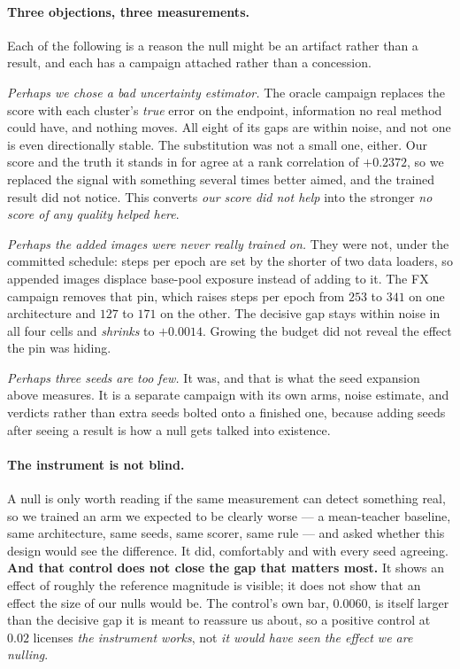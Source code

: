 \documentclass{article}
\begin{document}
\paragraph{Three objections, three measurements.} Each of the following is a reason the null might
be an artifact rather than a result, and each has a campaign attached rather than a concession.

\emph{Perhaps we chose a bad uncertainty estimator.} The oracle campaign replaces the score with each cluster's \emph{true} error on the endpoint, information no real method could have, and nothing moves. All eight of its gaps are within noise, and not one is even directionally stable.
The substitution was not a small one, either. Our score and the truth it stands in for agree at a
rank correlation of $+0.2372$, so we replaced the signal with something several times better aimed, and the trained result did not notice. This converts \emph{our score did not help} into the stronger
\emph{no score of any quality helped here}.

\emph{Perhaps the added images were never really trained on.} They were not, under the committed
schedule: steps per epoch are set by the shorter of two data loaders, so appended images displace
base-pool exposure instead of adding to it. The FX campaign removes that pin, which raises steps per
epoch from $253$ to $341$ on one architecture and $127$ to $171$ on the other. The decisive gap
stays within noise in all four cells and \emph{shrinks} to $+0.0014$. Growing the budget did not
reveal the effect the pin was hiding.

\emph{Perhaps three seeds are too few.} It was, and that is what the seed expansion above measures.
It is a separate campaign with its own arms, noise estimate, and verdicts rather than extra seeds
bolted onto a finished one, because adding seeds after seeing a result is how a null gets talked
into existence.

\paragraph{The instrument is not blind.} A null is only worth reading if the same measurement can
detect something real, so we trained an arm we expected to be clearly worse --- a mean-teacher
baseline, same architecture, same seeds, same scorer, same rule --- and asked whether this design
would see the difference. It did, comfortably and with every seed agreeing.
\textbf{And that control does not close the gap that matters most.} It shows an effect of roughly
the reference magnitude is visible; it does not show that an effect the size of our nulls would be.
The control's own bar, $0.0060$, is itself larger than the decisive gap it is meant to reassure us
about, so a positive control at $0.02$ licenses \emph{the instrument works}, not \emph{it would have
seen the effect we are nulling}.
\end{document}
